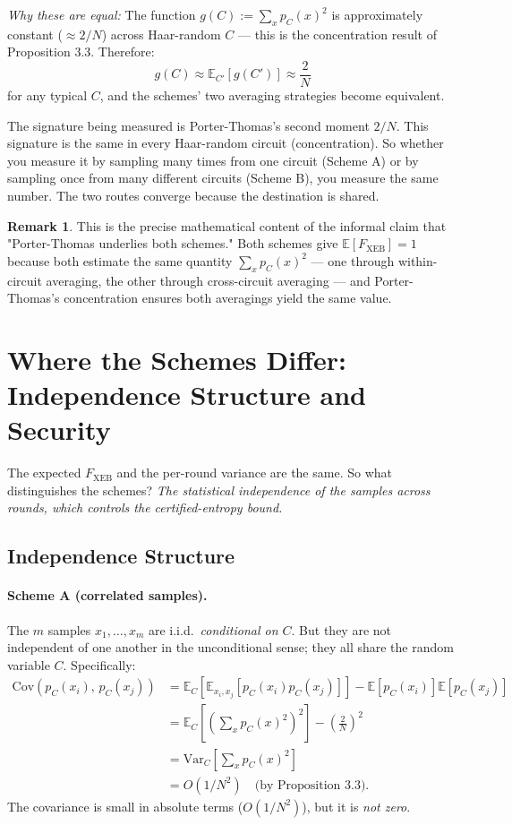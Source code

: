 \documentclass[11pt]{article}
\theoremstyle{plain}
\theoremstyle{definition}
\newtheorem{remark}[theorem]{Remark}
\newcommand{\Fxeb}{F_{\text{XEB}}}
\newcommand{\E}{\mathbb{E}}
\newcommand{\Var}{\mathrm{Var}}
\newcommand{\Cov}{\mathrm{Cov}}
\begin{document}
\emph{Why these are equal:}
The function $g(C) := \sum_x p_C(x)^2$ is approximately constant ($\approx 2/N$) across Haar-random $C$ --- this is the concentration result of Proposition 3.3. Therefore:
\[
g(C) \approx \E_{C'}[g(C')] \approx \frac{2}{N}
\]
for any typical $C$, and the schemes' two averaging strategies become equivalent.

\begin{intuition}
The signature being measured is Porter-Thomas's second moment $2/N$. This signature is the same in every Haar-random circuit (concentration). So whether you measure it by sampling many times from one circuit (Scheme A) or by sampling once from many different circuits (Scheme B), you measure the same number. The two routes converge because the destination is shared.
\end{intuition}

\begin{remark}
This is the precise mathematical content of the informal claim that "Porter-Thomas underlies both schemes." Both schemes give $\E[\Fxeb] = 1$ because both estimate the same quantity $\sum_x p_C(x)^2$ --- one through within-circuit averaging, the other through cross-circuit averaging --- and Porter-Thomas's concentration ensures both averagings yield the same value.
\end{remark}

\section{Where the Schemes Differ: Independence Structure and Security}
\label{sec:tightness}

The expected $\Fxeb$ and the per-round variance are the same. So what distinguishes the schemes? \emph{The statistical independence of the samples across rounds, which controls the certified-entropy bound.}

\subsection{Independence Structure}

\paragraph{Scheme A (correlated samples).}
The $m$ samples $x_1, \ldots, x_m$ are i.i.d.\ \emph{conditional on $C$}. But they are not independent of one another in the unconditional sense; they all share the random variable $C$. Specifically:
\begin{align}
\Cov(p_C(x_i),\, p_C(x_j))
&= \E_C\!\left[\E_{x_i, x_j}[p_C(x_i) p_C(x_j)] \right] - \E[p_C(x_i)] \E[p_C(x_j)] \nonumber \\
&= \E_C\!\left[\left(\sum_x p_C(x)^2\right)^2\right] - \left(\frac{2}{N}\right)^2 \nonumber \\
&= \Var_C\!\left[\sum_x p_C(x)^2\right] \nonumber \\
&= O(1/N^2) \quad \text{(by Proposition 3.3)}.
\label{eq:scheme-a-cov}
\end{align}
The covariance is small in absolute terms ($O(1/N^2)$), but it is \emph{not zero}.
\end{document}
